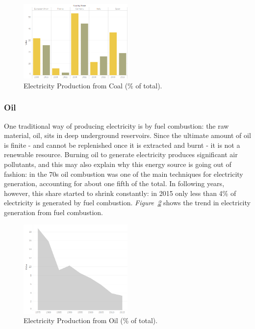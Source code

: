 \documentclass[a4paper,12pt]{book}
\begin{document}
\begin{figure}[tb]
\begin{center}
\captionsetup{justification=centering}
\includegraphics[width=0.5\textwidth]{Images/coal.png}
\caption{Electricity Production from Coal (\% of total). }
\label{fig:coal}
\end{center}
\end{figure}

\subsubsection*{Oil}

One traditional way of producing electricity is by fuel combustion: the raw material, oil, sits in deep underground reservoirs. Since the ultimate amount of oil is finite - and cannot be replenished once it is extracted and burnt - it is not a renewable resource. Burning oil to generate electricity produces significant air pollutants, and this may also explain why this energy source is going out of fashion: in the 70s oil combustion was one of the main techniques for electricity generation, accounting for about one fifth of the total. In following years, however, this share started to shrink constantly: in 2015 only less than 4\% of electricity is generated by fuel combustion. \textit{Figure~\ref{fig:oil}} shows the trend in electricity generation from fuel combustion.

\begin{figure}[tb]
\begin{center}
\captionsetup{justification=centering}
\includegraphics[width=0.5\textwidth]{Images/oil.png}
\caption{Electricity Production from Oil (\% of total).}
\label{fig:oil}
\end{center}
\end{figure}
\end{document}
